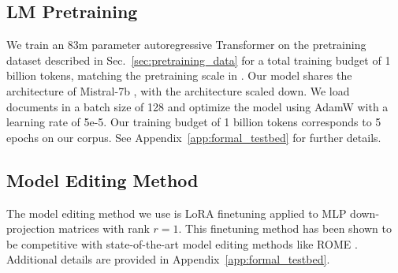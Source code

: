 \documentclass[11pt,a4paper]{article}
\begin{document}
\subsection{LM Pretraining}

 We train an 83m parameter autoregressive Transformer on the pretraining dataset described in Sec.~\ref{sec:pretraining_data} for a total training budget of 1 billion tokens, matching the pretraining scale in \citet{prystawski2024think}. 
 Our model shares the architecture of Mistral-7b \citep{mistral}, with the architecture scaled down. We load documents in a batch size of 128 and optimize the model using AdamW with a learning rate of 5e-5. 
 Our training budget of 1 billion tokens corresponds to 5 epochs on our corpus.
 See Appendix~\ref{app:formal_testbed} for further details.

\subsection{Model Editing Method}

The model editing method we use is LoRA finetuning applied to MLP down-projection matrices with rank $r{=}1$. This finetuning method has been shown to be competitive with state-of-the-art model editing methods like ROME \citep{hua2024propagation, gangadhar2024model}. Additional details are provided in Appendix~\ref{app:formal_testbed}.
\end{document}
